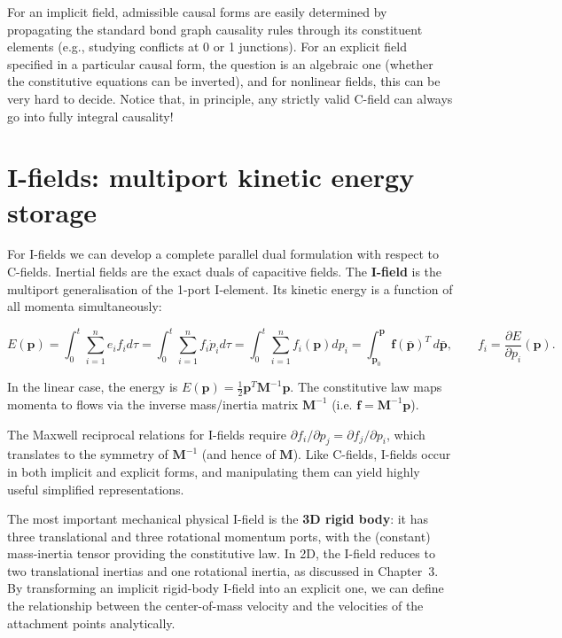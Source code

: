For an implicit field, admissible causal forms are easily determined by propagating the standard bond graph causality rules through its constituent elements (e.g., studying conflicts at 0 or 1 junctions). For an explicit field specified in a particular causal form, the question is an algebraic one (whether the constitutive equations can be inverted), and for nonlinear fields, this can be very hard to decide. Notice that, in principle, any strictly valid C-field can always go into fully integral causality!

\section{I-fields: multiport kinetic energy storage}

For I-fields we can develop a complete parallel dual formulation with respect to C-fields. Inertial fields are the exact duals of capacitive fields. The \textbf{I-field} is the multiport generalisation of the 1-port I-element. Its kinetic energy is a function of all momenta simultaneously:

\begin{equation}
  E(\mathbf{p}) = \int_{0}^{t} \sum_{i=1}^{n} e_i f_i d\tau = 
  \int_{0}^{t} \sum_{i=1}^{n} f_i \dot{p}_i d\tau = 
  \int_{0}^{t} \sum_{i=1}^{n} f_i (\mathbf{p}) dp_i =  
  \int_{\mathbf{p}_0}^{\mathbf{p}} \mathbf{f}(\bar{\mathbf{p}})^T\,d\bar{\mathbf{p}}, \qquad
  f_i = \frac{\partial E}{\partial p_i}(\mathbf{p}).
\end{equation}


In the linear case, the energy is $E(\mathbf{p}) = \frac{1}{2}\mathbf{p}^T\mathbf{M}^{-1}\mathbf{p}$. The constitutive law maps momenta to flows via the inverse mass/inertia matrix $\mathbf{M}^{-1}$ (i.e. $\mathbf{f} = \mathbf{M}^{-1}\mathbf{p}$). 

The Maxwell reciprocal relations for I-fields require $\partial f_i/\partial p_j = \partial f_j/\partial p_i$, which translates to the symmetry of $\mathbf{M}^{-1}$ (and hence of $\mathbf{M}$). Like C-fields, I-fields occur in both implicit and explicit forms, and manipulating them can yield highly useful simplified representations.

The most important mechanical physical I-field is the \textbf{3D rigid body}: it has three translational and three rotational momentum ports, with the (constant) mass-inertia tensor providing the constitutive law. In 2D, the I-field reduces to two translational inertias and one rotational inertia, as discussed in Chapter~3. By transforming an implicit rigid-body I-field into an explicit one, we can define the relationship between the center-of-mass velocity and the velocities of the attachment points analytically.


